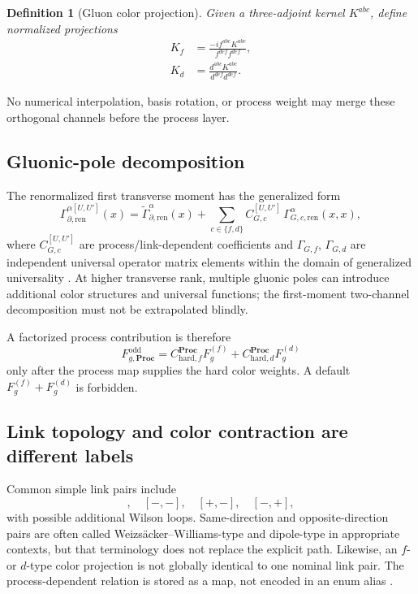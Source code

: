 \documentclass[11pt]{article}
\newtheorem{definition}{Definition}[section]
\newcommand{\Proc}{\mathbf{Proc}}
\newcommand{\ren}{\mathrm{ren}}
\newcommand{\odd}{\mathrm{odd}}
\newcommand{\hard}{\mathrm{hard}}
\begin{document}
\begin{definition}[Gluon color projection]
\label{def:gluon-color-projection}
Given a three-adjoint kernel \(K^{abc}\), define normalized projections
\begin{align}
 K_f&=\frac{-i f^{abc}K^{abc}}{f^{def}f^{def}},
\label{eq:f-projection}\\
 K_d&=\frac{d^{abc}K^{abc}}{d^{def}d^{def}}.
\label{eq:d-projection}
\end{align}
\end{definition}
No numerical interpolation, basis rotation, or process weight may merge these
orthogonal channels before the process layer.

\subsection{Gluonic-pole decomposition}

The renormalized first transverse moment has the generalized form
\begin{equation}
 \Gamma_{\partial,\ren}^{\alpha[U,U']}(x)
 =\widetilde\Gamma_{\partial,\ren}^{\alpha}(x)
 +\sum_{c\in\{f,d\}}
 C_{G,c}^{[U,U']}\,
 \Gamma_{G,c,\ren}^{\alpha}(x,x),
\label{eq:gluon-gluonic-pole-decomposition}
\end{equation}
where \(C_{G,c}^{[U,U']}\) are process/link-dependent coefficients and
\(\Gamma_{G,f}\), \(\Gamma_{G,d}\) are independent universal operator
matrix elements within the domain of generalized universality
\cite{BuffingGluon2013}.  At higher transverse rank, multiple gluonic poles
can introduce additional color structures and universal functions; the
first-moment two-channel decomposition must not be extrapolated blindly.

A factorized process contribution is therefore
\begin{equation}
 F_{g,\Proc}^{\odd}
 =C_{\hard,f}^{\Proc}F_g^{(f)}
 +C_{\hard,d}^{\Proc}F_g^{(d)}
\label{eq:process-fd-mixture}
\end{equation}
only after the process map supplies the hard color weights.  A default
\(F_g^{(f)}+F_g^{(d)}\) is forbidden.

\subsection{Link topology and color contraction are different labels}

Common simple link pairs include
\begin{equation}
 [+,+],\quad[-,-],\quad[+,-],\quad[-,+],
\label{eq:common-gluon-link-pairs}
\end{equation}
with possible additional Wilson loops.  Same-direction and opposite-direction
pairs are often called Weizs\"acker--Williams-type and dipole-type in
appropriate contexts, but that terminology does not replace the explicit
path.  Likewise, an \(f\)- or \(d\)-type color projection is not globally
identical to one nominal link pair.  The process-dependent relation is stored
as a map, not encoded in an enum alias \cite{Boer2016}.
\end{document}
